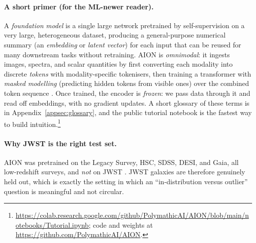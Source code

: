 \documentclass[onecolumn,astrosymb,tighten,longbib,trackchanges]{aastex7} %
\newcommand{\aion}{\textsc{AION}\xspace}
\begin{document}
\paragraph{A short primer (for the ML-newer reader).} A \emph{foundation model} is a single large
network pretrained by self-supervision on a very large, heterogeneous dataset, producing a
general-purpose numerical summary (an \emph{embedding} or \emph{latent vector}) for each input that
can be reused for many downstream tasks without retraining. \aion is \emph{omnimodal}: it ingests
images, spectra, and scalar quantities by first converting each modality into discrete \emph{tokens}
with modality-specific tokenisers, then training a transformer with \emph{masked modelling}
(predicting hidden tokens from visible ones) over the combined token sequence
\citep{Parker2025_AION_omnimodal}. Once trained, the encoder is \emph{frozen}: we pass data through
it and read off embeddings, with no gradient updates. A short glossary of these terms is in
Appendix~\ref{appsec:glossary}, and the public tutorial notebook is the fastest way to build
intuition.\footnote{\url{https://colab.research.google.com/github/PolymathicAI/AION/blob/main/notebooks/Tutorial.ipynb}; code and weights at \url{https://github.com/PolymathicAI/AION}.}

\paragraph{Why JWST is the right test set.} \aion was pretrained on the Legacy Survey, HSC, SDSS,
DESI, and Gaia, all low-redshift surveys, and \emph{not} on JWST \citep{Parker2025_AION_omnimodal}.
JWST galaxies are therefore genuinely held out, which is exactly the setting in which an
``in-distribution versus outlier'' question is meaningful and not circular.
\end{document}
